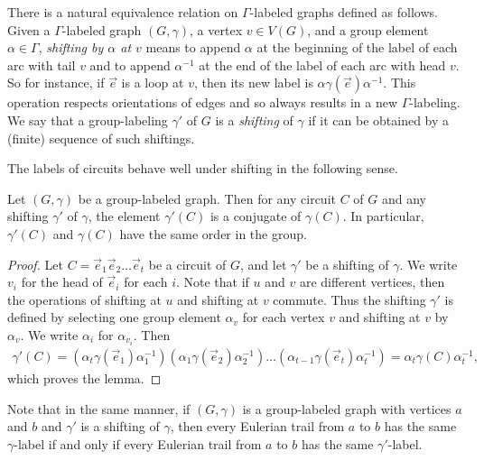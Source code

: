 \documentclass[a4paper, 12pt]{article}
\newcommand{\RMM}[1]{\textcolor{orange}{RM: #1}}
\begin{document}

There is a natural equivalence relation on $\Gamma$-labeled graphs defined as follows. Given a $\Gamma$-labeled graph $(G,\gamma)$, a vertex $v \in V(G)$, and a group element $\alpha \in \Gamma$, \textit{shifting by $\alpha$ at $v$} means to append $\alpha$ at the beginning of the label of each arc with tail $v$ and to append $\alpha^{-1}$ at the end of the label of each arc with head $v$. So for instance, if $\vec{e}$ is a loop at $v$, then its new label is $\alpha\gamma(\vec{e})\alpha^{-1}$. This operation respects orientations of edges and so always results in a new $\Gamma$-labeling. We say that a group-labeling $\gamma'$ of $G$ is a \emph{shifting} of $\gamma$ if it can be obtained by a (finite) sequence of such shiftings. 

The labels of circuits behave well under shifting in the following sense. 

\begin{lemma}
\label{lem:basicProperties}
Let $(G, \gamma)$ be a group-labeled graph.  Then for any circuit $C$ of $G$ and any shifting $\gamma'$ of $\gamma$, the element $\gamma'(C)$ is a conjugate of $\gamma(C)$. In particular, $\gamma'(C)$ and $\gamma(C)$ have the same order in the group.
\end{lemma}
\begin{proof}
    Let $C= \vec{e}_1 \vec{e}_2 \dots \vec{e}_t$ be a circuit of $G$, and let $\gamma'$ be a shifting of $\gamma$. We write $v_i$ for the head of $\vec{e}_i$ for each $i$. Note that if $u$ and $v$ are different vertices, then the operations of shifting at $u$ and shifting at $v$ commute. Thus the shifting $\gamma'$ is defined by selecting one group element $\alpha_v$ for each vertex $v$ and shifting at $v$ by $\alpha_v$. We write $\alpha_{i}$ for $\alpha_{v_i}$. Then 
    \begin{align*}
    \gamma'(C) = (\alpha_t \gamma(\vec{e}_1) \alpha_1^{-1}) (\alpha_1 \gamma(\vec{e}_2) \alpha_2^{-1}) \dots (\alpha_{t-1} \gamma(\vec{e}_t) \alpha_t^{-1}) = \alpha_t \gamma(C) \alpha_t^{-1},
    \end{align*} which proves the lemma.
\end{proof}

Note that in the same manner, if $(G, \gamma)$ is a group-labeled graph with vertices $a$ and $b$ and $\gamma'$ is a shifting of $\gamma$, then every Eulerian trail from $a$ to $b$ has the same $\gamma$-label if and only if every Eulerian trail from $a$ to $b$ has the same $\gamma'$-label.
\end{document}
